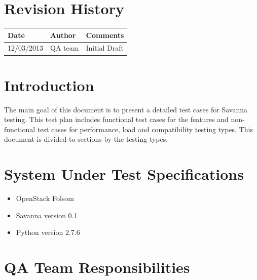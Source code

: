\documentclass[a4paper,11pt]{article}
\begin{document}
\thispagestyle{empty}

\clearpage

\pagestyle{fancy}
\thispagestyle{fancy}

\tableofcontents

\newpage

\section{Revision History}

\begin{tabular}{|l|p{4cm}|p{10cm}|}
\hline
{\bf Date} & {\bf Author} & {\bf Comments} \\ 
\hline
12/03/2013 & QA team & Initial Draft \\ 
\hline
\end{tabular}





\section{Introduction}

The main goal of this document is to present a detailed test cases for Savanna testing. This test plan includes functional test cases for the features and non-functional test cases for performance, load and compatibility testing types. This document is divided to sections by the testing types. 





\section{System Under Test Specifications}

\begin{itemize}
\item OpenStack Folsom
\item Savanna version 0.1
\item Python version 2.7.6
\end{itemize}





\section{QA Team Responsibilities}
\end{document}

